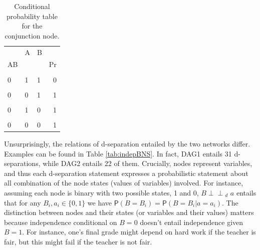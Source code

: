\documentclass[
  10pt,
  dvipsnames,enabledeprecatedfontcommands]{scrartcl}
\newcommand{\indep}{\!\perp \!\!\! \perp\!}
\newcommand{\pr}[1]{\ensuremath{\mathsf{P}(#1)}}
\begin{document}
\begin{table}[h]
\begin{table}[H]
\centering
\begin{tabular}{lllr}
\toprule
\multicolumn{1}{c}{} & \multicolumn{1}{c}{A} & \multicolumn{1}{c}{B} & \multicolumn{1}{c}{} \\
AB &  &  & Pr\\
\midrule
\cellcolor{gray!6}{1} & \cellcolor{gray!6}{1} & \cellcolor{gray!6}{1} & \cellcolor{gray!6}{1}\\
0 & 1 & 1 & 0\\
\cellcolor{gray!6}{1} & \cellcolor{gray!6}{0} & \cellcolor{gray!6}{1} & \cellcolor{gray!6}{0}\\
0 & 0 & 1 & 1\\
\cellcolor{gray!6}{1} & \cellcolor{gray!6}{1} & \cellcolor{gray!6}{0} & \cellcolor{gray!6}{0}\\
0 & 1 & 0 & 1\\
\cellcolor{gray!6}{1} & \cellcolor{gray!6}{0} & \cellcolor{gray!6}{0} & \cellcolor{gray!6}{0}\\
0 & 0 & 0 & 1\\
\bottomrule
\end{tabular}
\end{table}
\normalsize
\caption{Conditional probability table for the conjunction node.}
\label{tab:CPTconjunction2}
\end{table}

\newpage 
\vspace{1mm}
\footnotesize

\normalsize

Unsurprisingly, the relations of d-separation entailed by the two
networks differ. Examples can be found in Table \ref{tab:indepBNS}. In
fact, \textsf{DAG1} entails 31 d-separations, while \textsf{DAG2}
entails 22 of them. Crucially, nodes represent variables, and thus each
d-separation statement expresses a probabilistic statement about all
combination of the node states (values of variables) involved. For
instance, assuming each node is binary with two possible states, 1 and
0, \mbox{$B   \indep_d\,\,  a $} entails that for any
\mbox{$ B_i, a_i \in \{0, 1\}$} we have
\(\pr{B = B_i} = \pr{B = B_i \vert a = a_i}\). The distinction between
nodes and their states (or variables and their values) matters because
independence conditional on \(B= 0\) doesn't entail independence given
\(B=1\). For instance, one's final grade might depend on hard work if
the teacher is fair, but this might fail if the teacher is not fair.
\end{document}
